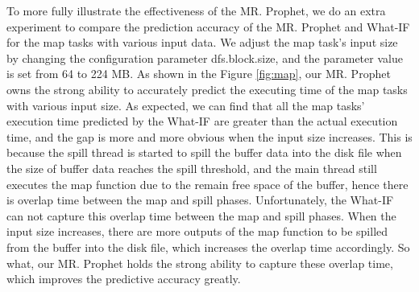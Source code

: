 To more fully illustrate the effectiveness of the MR. Prophet, we do an extra experiment to compare the prediction accuracy of the MR. Prophet and What-IF for the map tasks with various input data. We adjust the map task's input size by changing the configuration parameter dfs.block.size, and the parameter value is set from 64 to 224 MB. As shown in the Figure \ref{fig:map}, our MR. Prophet owns the strong ability to accurately predict the executing time of the map tasks with various input size. As expected, we can find that all the map tasks' execution time predicted by the What-IF are greater than the actual execution time, and the gap is more and more obvious when the input size increases. This is because the spill thread is started to spill the buffer data into the disk file when the size of buffer data reaches the spill threshold, and the main thread still executes the map function due to the remain free space of the buffer, hence there is overlap time between the map and spill phases. Unfortunately, the What-IF can not capture this overlap time between the map and spill phases. When the input size increases, there are more outputs of the map function to be spilled from the buffer into the disk file, which increases the overlap time accordingly. So what, our MR. Prophet holds the strong ability to capture these overlap time, which improves the predictive accuracy greatly.
